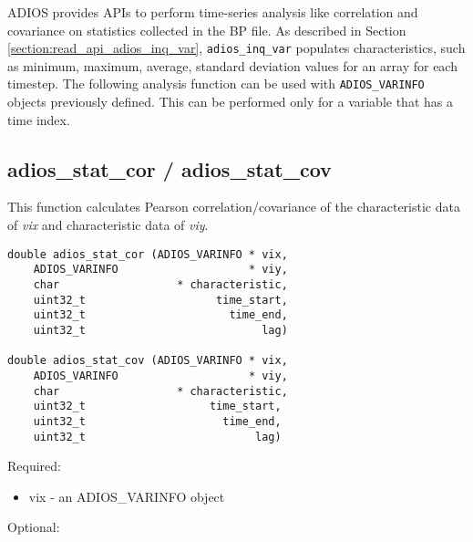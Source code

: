 ADIOS provides APIs to perform time-series analysis like correlation and covariance 
on statistics collected in the BP file. As described in Section \ref{section:read_api_adios_inq_var}, \verb+adios_inq_var+ 
populates characteristics, such as minimum, maximum, average, standard deviation 
values for an array for each timestep. The following analysis function can be used 
with \verb+ADIOS_VARINFO+ objects previously defined. This can be performed only for 
a variable that has a time index.

\subsection{adios\_stat\_cor / adios\_stat\_cov}

This function calculates Pearson correlation/covariance of the characteristic data 
of \textit{vix} and characteristic data of \textit{viy}.

\begin{lstlisting}[]
double adios_stat_cor (ADIOS_VARINFO * vix, 
    ADIOS_VARINFO                    * viy, 
    char                  * characteristic, 
    uint32_t                    time_start, 
    uint32_t                      time_end, 
    uint32_t                           lag)

double adios_stat_cov (ADIOS_VARINFO * vix, 
    ADIOS_VARINFO                    * viy, 
    char                  * characteristic, 
    uint32_t                   time_start, 
    uint32_t                     time_end, 
    uint32_t                          lag)
\end{lstlisting}

Required:

\begin{itemize}
\item vix - an ADIOS\_VARINFO object
\end{itemize}

Optional:

